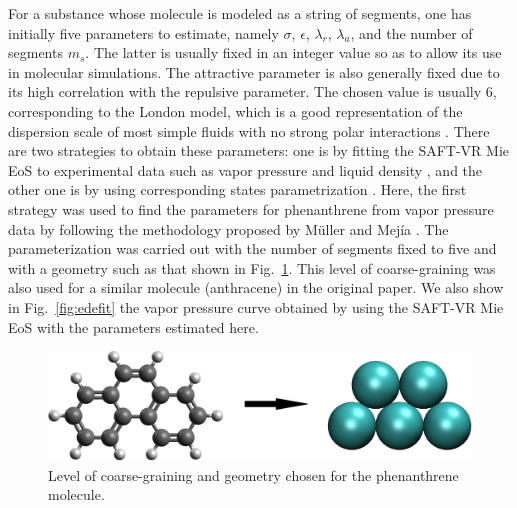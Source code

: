 \documentclass[final,12p,times,twocolumn]{elsarticle}
\begin{document}
	For a substance whose molecule is modeled as a string of segments, one has initially five parameters to estimate, namely $\sigma$, $\epsilon$, $\lambda_r$, $\lambda_a$, and the number of segments $m_s$. The latter is usually fixed in an integer value so as to allow its use in molecular simulations. The attractive parameter is also generally fixed due to its high correlation with the repulsive parameter. The chosen value is usually $6$, corresponding to the London model, which is a good representation of the dispersion scale of most simple fluids with no strong polar interactions \cite{ramrattan2015,herdes2015}. There are two strategies to obtain these parameters: one is by fitting the SAFT-VR Mie EoS to experimental data such as vapor pressure and liquid density \cite{avendano2013}, and the other one is by using corresponding states parametrization \cite{mejia2014}. Here, the first strategy was used to find the parameters for phenanthrene from vapor pressure data \cite{murphy,osborn} by following the methodology proposed by M\"{u}ller and Mej\'{i}a \cite{muller2017}. The parameterization was carried out with the number of segments fixed to five and with a geometry such as that shown in Fig.~\ref{fig:fen5}. This level of coarse-graining was also used for a similar molecule (anthracene) in the original paper. We also show in Fig.~\ref{fig:edefit} the vapor pressure curve obtained by using the SAFT-VR Mie EoS with the parameters estimated here.
	
	\begin{figure}[ht]
		\includegraphics[width=0.9\columnwidth]{Figures/phenanthrene}
		\caption{Level of coarse-graining and geometry chosen for the phenanthrene molecule.}
		\label{fig:fen5}
	\end{figure}
	
\end{document}
